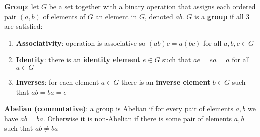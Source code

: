\documentclass{article}
\begin{document}
  \textbf{Group}: let $G$ be a set together with a binary operation that assigns each ordered pair $(a,b)$ of elements of $G$ an element in $G$, denoted $ab$. $G$ is a \textbf{group} if all 3 are satisfied:
  \begin{enumerate}
    \item \textbf{Associativity}: operation is associative so $(ab)c = a(bc)$ for all $a, b, c \in G$
    \item \textbf{Identity}: there is an \textbf{identity element} $e \in G$ such that $ae = ea = a$ for all $a \in G$
    \item \textbf{Inverses}: for each element $a \in G$ there is an \textbf{inverse element} $b \in G$ such that $ab = ba = e$
  \end{enumerate}

  \textbf{Abelian (commutative)}: a group is Abelian if for every pair of elements $a,b$ we have $ab = ba$. Otherwise it is non-Abelian if there is some pair of elements $a,b$ such that $ab \neq ba$
\end{document}
